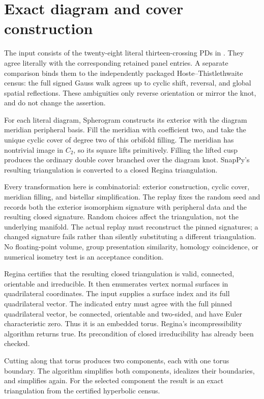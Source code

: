 \documentclass[11pt]{article}
\begin{document}
\section{Exact diagram and cover construction}

The input consists of the twenty-eight literal thirteen-crossing PDs in
. They agree literally with the
corresponding retained panel entries. A separate comparison binds them
to the independently packaged Hoste--Thistlethwaite census:
the full signed Gauss walk agrees up to cyclic shift, reversal,
and global spatial reflections. These ambiguities only reverse
orientation or mirror the knot, and do not change the assertion.

For each literal diagram, Spherogram constructs its exterior with the
diagram meridian peripheral basis. Fill the meridian with coefficient
two, and take the unique cyclic cover of degree two of this orbifold
filling. The meridian has nontrivial image in $C_2$, so its square lifts
primitively. Filling the lifted cusp produces the ordinary
double cover branched over the diagram knot. SnapPy's resulting
triangulation is converted to a closed Regina triangulation.

Every transformation here is combinatorial: exterior construction,
cyclic cover, meridian filling, and bistellar simplification.
The replay fixes the random seed and records both the exterior
isomorphism signature with peripheral data and the resulting closed
signature. Random choices affect the triangulation, not the underlying
manifold. The actual replay must reconstruct the pinned signatures;
a changed signature fails rather than silently substituting a
different triangulation. No floating-point volume, group presentation
similarity, homology coincidence, or numerical isometry test is
an acceptance condition.

Regina certifies that the resulting closed triangulation is valid,
connected, orientable and irreducible. It then enumerates vertex normal
surfaces in quadrilateral coordinates. The input supplies a surface index and its full quadrilateral vector. The indicated entry must agree
with the full pinned quadrilateral vector, be connected, orientable and
two-sided, and have Euler characteristic zero. Thus it is an embedded
torus. Regina's incompressibility algorithm returns true.
Its precondition of closed irreducibility has already been checked.

Cutting along that torus produces two components, each with one torus
boundary. The algorithm simplifies both components, idealizes their
boundaries, and simplifies again. For the selected component the result
is an exact triangulation from the certified hyperbolic census.
\end{document}
